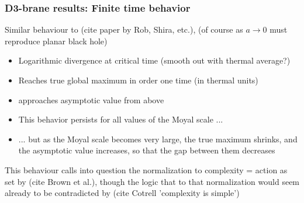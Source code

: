 \documentclass[10pt]{beamer}
\begin{document}

\begin{frame}
\frametitle{D3-brane results: Finite time behavior}

Similar behaviour to (cite paper by Rob, Shira, etc.), (of course as $a\rightarrow 0$ must reproduce planar black hole)

\begin{itemize}

\item Logarithmic divergence at critical time (smooth out with thermal average?)

\item Reaches true global maximum in order one time (in thermal units)

\item approaches asymptotic value from above

\item This behavior persists for all values of the Moyal scale ...

\item ... but as the Moyal scale becomes very large, the true maximum shrinks, and the asymptotic value increases, so that the gap between them decreases

\end{itemize}

This behaviour calls into question the normalization to complexity = action as set by (cite Brown et al.), though the logic that to that normalization would seem already to be contradicted by (cite Cotrell 'complexity is simple')

\end{frame}
\end{document}
